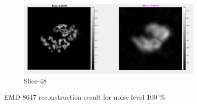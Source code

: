 \documentclass{report}
\begin{document}
\begin{figure}[H]
\begin{subfigure}{1\textwidth}
\centering
\includegraphics[width=1\linewidth]{emd_8647_result_sharp_4.png}
\captionsetup{justification=centering}
\caption{ Slice-48 }
\end{subfigure} 


\caption{EMD-8647 reconstruction result for noise level 100  \%}
\label{fig:EMD-8647 Reconstruction: Result-noise 100}
\end{figure}


\end{document}

